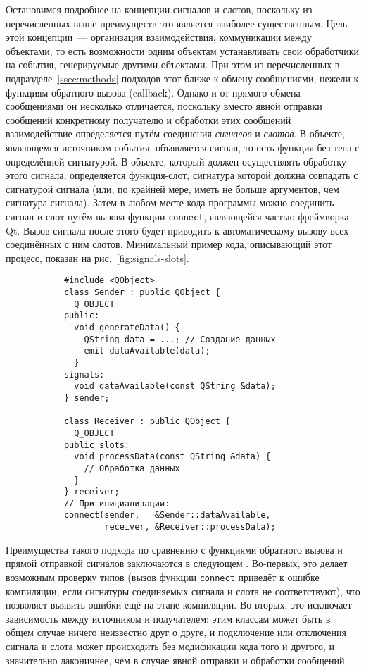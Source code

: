 \documentclass[a4paper, 14pt, titlepage]{extarticle}
\newcommand{\inlinecode}[1]{\lstinline[basicstyle=\ttfamily]{#1}}
\newcommand{\eng}[1]{\foreignlanguage{english}{#1}}
\newcommand{\term}[1]{\emph{#1}}
\newenvironment{myfigure}[2]%
    {\pushQED{\caption{#1} \label{#2}} %
     \begin{figure}[!htb]\centering } %
    {  \popQED %
     \end{figure}}
\begin{document}
  Остановимся подробнее на концепции сигналов и слотов, поскольку из перечисленных выше преимуществ
  это является наиболее существенным. Цель этой концепции~--- организация взаимодействия,
  коммуникации между объектами, то есть возможности одним объектам устанавливать свои обработчики на
  события, генерируемые другими объектами. При этом из перечисленных в подразделе~\ref{ssec:methods}
  подходов этот ближе к обмену сообщениями, нежели к функциям обратного вызова (\eng{callback}).
  Однако и от прямого обмена сообщениями он несколько отличается, поскольку вместо явной отправки
  сообщений конкретному получателю и обработки этих сообщений взаимодействие определяется путём
  соединения \term{сигналов} и \term{слотов}. В объекте, являющемся источником события, объявляется
  сигнал, то есть функция без тела с определённой сигнатурой. В объекте, который должен осуществлять
  обработку этого сигнала, определяется функция-слот, сигнатура которой должна совпадать с
  сигнатурой сигнала (или, по крайней мере, иметь не больше аргументов, чем сигнатура сигнала).
  Затем в любом месте кода программы можно соединить сигнал и слот путём вызова функции
  \inlinecode{connect}, являющейся частью фреймворка Qt. Вызов сигнала после этого будет приводить к
  автоматическому вызову всех соединённых с ним слотов. Минимальный пример кода, описывающий этот
  процесс, показан на рис.~\ref{fig:signals-slots}.

  \begin{myfigure}{Взаимодействие объектов с помощью сигналов и слотов в Qt}{fig:signals-slots}
    \begin{lstlisting}
      #include <QObject>
      class Sender : public QObject {
        Q_OBJECT
      public:
        void generateData() {
          QString data = ...; // Создание данных
          emit dataAvailable(data);
        }
      signals:
        void dataAvailable(const QString &data);
      } sender;

      class Receiver : public QObject {
        Q_OBJECT
      public slots:
        void processData(const QString &data) {
          // Обработка данных
        }
      } receiver;
      // При инициализации:
      connect(sender,   &Sender::dataAvailable,
              receiver, &Receiver::processData);
    \end{lstlisting}
  \end{myfigure}

  Преимущества такого подхода по сравнению с функциями обратного вызова и прямой отправкой сигналов
  заключаются в следующем \cite{qt-signals-slots}. Во-первых, это делает возможным проверку типов
  (вызов функции \inlinecode{connect} приведёт к ошибке компиляции, если сигнатуры соединяемых
  сигнала и слота не соответствуют), что позволяет выявить ошибки ещё на этапе компиляции.
  Во-вторых, это исключает зависимость между источником и получателем: этим классам может быть в
  общем случае ничего неизвестно друг о друге, и подключение или отключения сигнала и слота может
  происходить без модификации кода того и другого, и значительно лаконичнее, чем в случае явной
  отправки и обработки сообщений.
\end{document}
